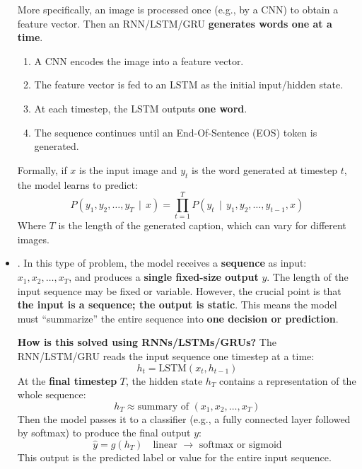 \begin{itemize}
\begin{examplebox}
        More specifically, an image is processed once (e.g., by a CNN) to obtain a feature vector. Then an RNN/LSTM/GRU \textbf{generates words one at a time}.
        \begin{enumerate}
            \item A CNN encodes the image into a feature vector.
            \item The feature vector is fed to an LSTM as the initial input/hidden state.
            \item At each timestep, the LSTM outputs \textbf{one word}.
            \item The sequence continues until an End-Of-Sentence (EOS) token is generated.
        \end{enumerate}
        Formally, if $x$ is the input image and $y_t$ is the word generated at timestep $t$, the model learns to predict:
        \begin{equation*}
            P\left(y_1, y_2, \ldots, y_T \, \mid \, x\right) = \prod_{t=1}^{T} P\left(y_t \, \mid \, y_1, y_2, \ldots, y_{t-1}, x\right)
        \end{equation*}
        Where $T$ is the length of the generated caption, which can vary for different images.
    \end{examplebox}


    \item[\textcolor{Red3}{\faIcon{book}}] . In this type of problem, the model receives a \textbf{sequence} as input: $x_1, x_2, \ldots, x_T$, and produces a \textbf{single fixed-size output} $y$. The length of the input sequence may be fixed or variable. However, the crucial point is that \textbf{the input is a sequence; the output is static}. This means the model must ``summarize'' the entire sequence into \textbf{one decision or prediction}.

    \textcolor{Green3}{ \textbf{How is this solved using RNNs/LSTMs/GRUs?}} The RNN/LSTM/GRU reads the input sequence one timestep at a time:
    \begin{equation*}
        h_t = \text{LSTM}\left(x_t, h_{t-1}\right)
    \end{equation*}
    At the \textbf{final timestep} $T$, the hidden state $h_T$ contains a representation of the whole sequence:
    \begin{equation*}
        h_T \approx \text{summary of } \left(x_1, x_2, \ldots, x_T\right)
    \end{equation*}
    Then the model passes it to a classifier (e.g., a fully connected layer followed by softmax) to produce the final output $y$:
    \begin{equation*}
        \hat{y} = g\left(h_T\right) \quad \text{linear } \to \text{ softmax or sigmoid}
    \end{equation*}
    This output is the predicted label or value for the entire input sequence.


\end{itemize}
